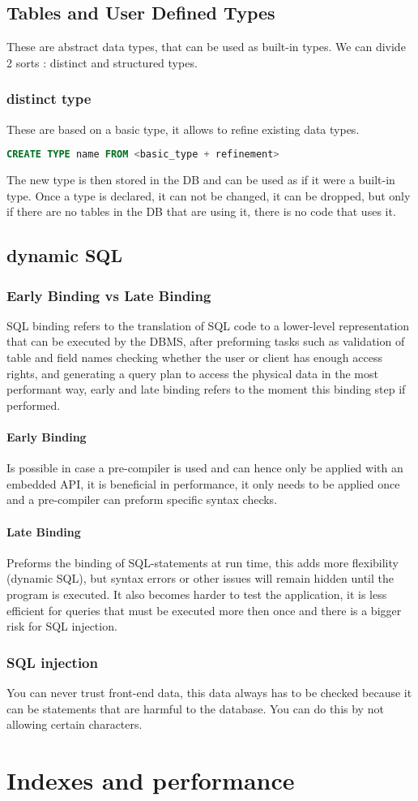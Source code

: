 \documentclass{report}
\begin{document}
		\section{Tables and User Defined Types}	
			These are abstract data types, that can be used as built-in types. We can divide 2 sorts : distinct and structured types. 
			\subsection{distinct type}
				These are based on a basic type, it allows to refine existing data types.
				\begin{lstlisting}[language = sql]
	CREATE TYPE name FROM <basic_type + refinement>\end{lstlisting}
				The new type is then stored in the DB and can be used as if it were a built-in type. Once a type is declared, it can not be changed, it can be dropped, but only if there are no tables in the DB that are using it, there is no code that uses it. 
		\section{dynamic SQL}
			\subsection{Early Binding vs Late Binding}
				SQL binding refers to the translation of SQL code to a lower-level representation that can be executed by the DBMS, after preforming tasks such as validation of table and field names checking whether the user or client has enough access rights, and generating a query plan to access the physical data in the most performant way, early and late binding refers to the moment this binding step if performed.
				\subsubsection{Early Binding}
					Is possible in case a pre-compiler is used and can hence only be applied with an embedded API, it is beneficial in performance, it only needs to be applied once and a pre-compiler can preform specific syntax checks. 
				\subsubsection{Late Binding}
					Preforms the binding of SQL-statements at run time, this adds more flexibility (dynamic SQL), but syntax errors or other issues will remain hidden until the program is executed. It also becomes harder to test the application, it is less efficient for queries that must be executed more then once and there is a bigger risk for SQL injection. 
			\subsection{SQL injection}
				You can never trust front-end data, this data always has to be checked because it can be statements that are harmful to the database. You can do this by not allowing certain characters. 
	\chapter{Indexes and performance}
\end{document}
